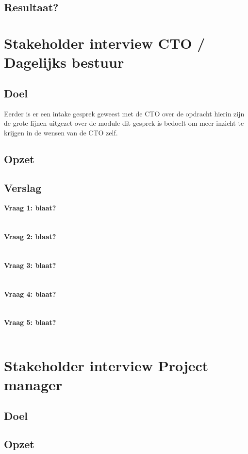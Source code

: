 \subsection{Resultaat?}

\section{Stakeholder interview CTO / Dagelijks bestuur}
\subsection{Doel}
Eerder is er een intake gesprek geweest met de CTO over de opdracht hierin zijn de grote lijnen uitgezet over de module dit gesprek is bedoelt om meer inzicht te krijgen in de wensen van de CTO zelf.
\subsection{Opzet}

\subsection{Verslag}
\textbf{Vraag 1: blaat?}\\
\lipsum[01]\\
\\
\textbf{Vraag 2: blaat?}\\
\lipsum[02]\\
\\
\textbf{Vraag 3: blaat?}\\
\lipsum[03]\\
\\
\textbf{Vraag 4: blaat?}\\
\lipsum[04]\\
\\
\textbf{Vraag 5: blaat?}\\
\lipsum[05]\\

\section{Stakeholder interview Project manager}
\subsection{Doel}
\subsection{Opzet}
